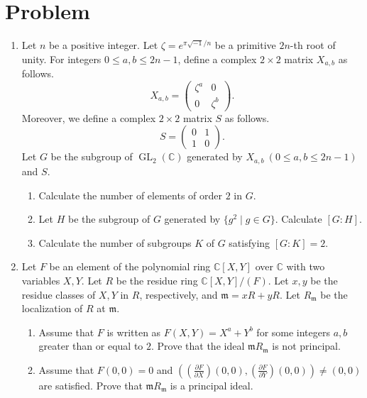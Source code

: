 \documentclass[10pt,a4paper]{article}
\begin{document}
\section*{Problem}
\begin{enumerate}[label=\fbox{\arabic*}]
  \item %
        Let $n$ be a positive integer. Let $\zeta = e^{\pi \sqrt{-1} / n}$ be a primitive $2n$-th root of unity. For integers $0 \le a, b \le 2n-1$, define a complex $2 \times 2$ matrix $X_{a, b}$ as follows.
        \[
          X_{a, b} = \begin{pmatrix} \zeta^a & 0 \\ 0 & \zeta^b \end{pmatrix}.
        \]
        Moreover, we define a complex $2 \times 2$ matrix $S$ as follows.
        \[
          S = \begin{pmatrix} 0 & 1 \\ 1 & 0 \end{pmatrix}.
        \]
        Let $G$ be the subgroup of $\operatorname{GL}_2(\mathbb{C})$ generated by $X_{a, b} \ (0 \le a, b \le 2n-1)$ and $S$.
        \begin{enumerate}[label=(\arabic*)]
          \item Calculate the number of elements of order $2$ in $G$.
          \item Let $H$ be the subgroup of $G$ generated by $\{g^2 \mid g \in G\}$. Calculate $[G : H]$.
          \item Calculate the number of subgroups $K$ of $G$ satisfying $[G : K] = 2$.
        \end{enumerate}

  \item %
        Let $F$ be an element of the polynomial ring $\mathbb{C}[X, Y]$ over $\mathbb{C}$ with two variables $X, Y$. Let $R$ be the residue ring $\mathbb{C}[X, Y]/(F)$. Let $x, y$ be the residue classes of $X, Y$ in $R$, respectively, and $\mathfrak{m} = xR + yR$. Let $R_\mathfrak{m}$ be the localization of $R$ at $\mathfrak{m}$.
        \begin{enumerate}[label=(\arabic*)]
          \item Assume that $F$ is written as $F(X, Y) = X^a + Y^b$ for some integers $a, b$ greater than or equal to $2$. Prove that the ideal $\mathfrak{m} R_\mathfrak{m}$ is not principal.
          \item Assume that $F(0, 0) = 0$ and $\left( \left( \frac{\partial F}{\partial X} \right)(0, 0), \left( \frac{\partial F}{\partial Y} \right)(0, 0) \right) \neq (0, 0)$ are satisfied. Prove that $\mathfrak{m} R_\mathfrak{m}$ is a principal ideal.
        \end{enumerate}


\end{enumerate}
\end{document}
